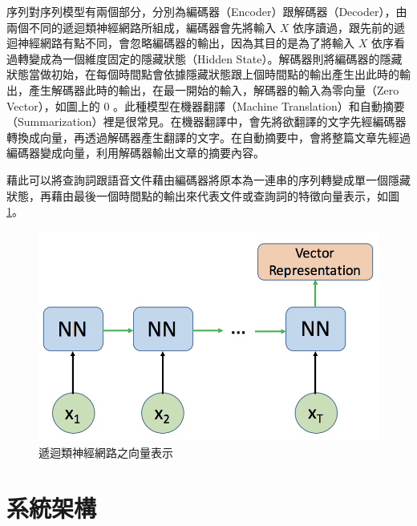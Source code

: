 序列對序列模型有兩個部分，分別為編碼器（Encoder）跟解碼器（Decoder），由兩個不同的遞迴類神經網路所組成，編碼器會先將輸入 $ X $ 依序讀過，跟先前的遞迴神經網路有點不同，會忽略編碼器的輸出，因為其目的是為了將輸入 $ X $ 依序看過轉變成為一個維度固定的隱藏狀態（Hidden
State）。解碼器則將編碼器的隱藏狀態當做初始，在每個時間點會依據隱藏狀態跟上個時間點的輸出產生出此時的輸出，產生解碼器此時的輸出，在最一開始的輸入，解碼器的輸入為零向量（Zero
Vector），如圖上的 $ 0 $ 。此種模型在機器翻譯（Machine
Translation）和自動摘要（Summarization）裡是很常見。在機器翻譯中，會先將欲翻譯的文字先經編碼器轉換成向量，再透過解碼器產生翻譯的文字。在自動摘要中，會將整篇文章先經過編碼器變成向量，利用解碼器輸出文章的摘要內容。

藉此可以將查詢詞跟語音文件藉由編碼器將原本為一連串的序列轉變成單一個隱藏狀態，再藉由最後一個時間點的輸出來代表文件或查詢詞的特徵向量表示，如圖\ref{ch3_RNNVC}。

\begin{figure}[h]
\centering
\includegraphics[scale=0.5]{images/ch3_RNNVC.png} 
\caption{遞迴類神經網路之向量表示}
\label{ch3_RNNVC}
\end{figure}

\section{系統架構}
